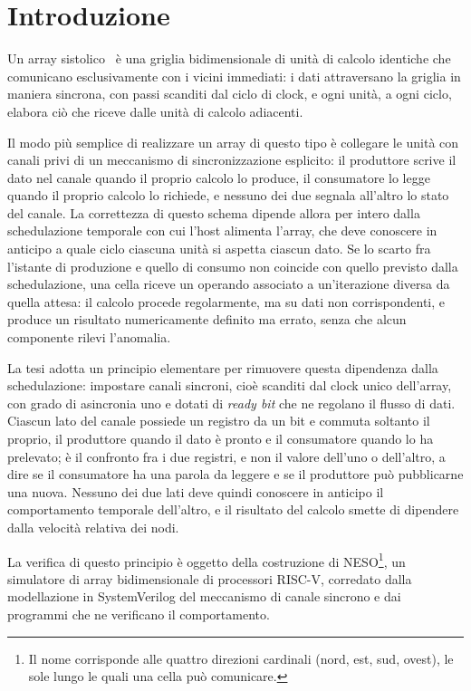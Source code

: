 \chapter{Introduzione}
\label{ch:introduzione}

Un array sistolico~\cite{KungLeiserson} è una griglia bidimensionale di unità di calcolo identiche
che comunicano esclusivamente con i vicini immediati: i dati attraversano la
griglia in maniera sincrona, con passi scanditi dal ciclo di clock, e ogni unità, 
a ogni ciclo, elabora ciò che riceve dalle unità di calcolo adiacenti.

Il modo più semplice di realizzare un array di questo tipo è collegare le
unità con canali privi di un meccanismo di sincronizzazione esplicito: il
produttore scrive il dato nel canale quando il proprio calcolo lo produce, il
consumatore lo legge quando il proprio calcolo lo richiede, e nessuno dei due
segnala all'altro lo stato del canale. La correttezza di questo schema
dipende allora per intero dalla schedulazione temporale con cui l'host
alimenta l'array, che deve conoscere in anticipo a quale ciclo ciascuna unità
si aspetta ciascun dato. Se lo scarto fra l'istante di produzione e quello di
consumo non coincide con quello previsto dalla schedulazione, una cella
riceve un operando associato a un'iterazione diversa da quella attesa: il
calcolo procede regolarmente, ma su dati non corrispondenti, e produce un
risultato numericamente definito ma errato, senza che alcun componente rilevi
l'anomalia.

La tesi adotta un principio elementare per rimuovere questa dipendenza dalla
schedulazione: impostare canali sincroni, cioè
scanditi dal clock unico dell'array, con grado di asincronia uno e dotati di
\emph{ready bit} che ne regolano il flusso di dati. Ciascun lato del canale possiede
un registro da un bit e commuta soltanto il proprio, il produttore quando il dato è
pronto e il consumatore quando lo ha prelevato; è il confronto fra i due registri,
e non il valore dell'uno o dell'altro, a dire se il consumatore ha una parola da leggere e se il produttore può
pubblicarne una nuova. Nessuno
dei due lati deve quindi conoscere in anticipo il comportamento temporale
dell'altro, e il risultato del calcolo smette di dipendere dalla velocità relativa
dei nodi.

La verifica di questo principio è oggetto della costruzione di
NESO\footnote{Il nome corrisponde alle quattro direzioni cardinali
(nord, est, sud, ovest), le sole lungo le quali una cella può comunicare.}, un
simulatore di array bidimensionale di processori RISC-V, corredato dalla
modellazione in SystemVerilog del meccanismo di canale sincrono e dai programmi che ne
verificano il comportamento.

